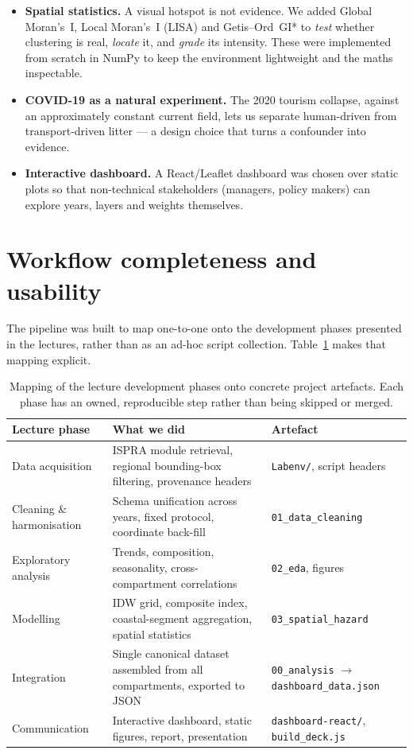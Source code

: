\documentclass[11pt,a4paper]{article}
\begin{document}
\begin{itemize}
\item \textbf{Spatial statistics.} A visual hotspot is not evidence. We added Global
Moran's~I, Local Moran's~I (LISA) and Getis--Ord~GI* to \emph{test} whether clustering is real,
\emph{locate} it, and \emph{grade} its intensity. These were implemented from scratch in NumPy to
keep the environment lightweight and the maths inspectable.

\item \textbf{COVID-19 as a natural experiment.} The 2020 tourism collapse, against an
approximately constant current field, lets us separate human-driven from transport-driven litter ---
a design choice that turns a confounder into evidence.

\item \textbf{Interactive dashboard.} A React/Leaflet dashboard was chosen over static plots so
that non-technical stakeholders (managers, policy makers) can explore years, layers and weights
themselves.
\end{itemize}

\section{Workflow completeness and usability}
The pipeline was built to map one-to-one onto the development phases presented in the lectures,
rather than as an ad-hoc script collection. Table~\ref{tab:phases} makes that mapping explicit.

\begin{table}[h]
\centering\small
\begin{tabular}{@{}p{3.2cm}p{5.0cm}p{5.0cm}@{}}
\toprule
\textbf{Lecture phase} & \textbf{What we did} & \textbf{Artefact}\\
\midrule
Data acquisition & ISPRA module retrieval, regional bounding-box filtering, provenance headers &
\texttt{Labenv/}, script headers\\
Cleaning \& harmonisation & Schema unification across years, fixed protocol, coordinate back-fill &
\texttt{01\_data\_cleaning}\\
Exploratory analysis & Trends, composition, seasonality, cross-compartment correlations &
\texttt{02\_eda}, figures\\
Modelling & IDW grid, composite index, coastal-segment aggregation, spatial statistics &
\texttt{03\_spatial\_hazard}\\
Integration & Single canonical dataset assembled from all compartments, exported to JSON &
\texttt{00\_analysis} $\rightarrow$ \texttt{dashboard\_data.json}\\
Communication & Interactive dashboard, static figures, report, presentation &
\texttt{dashboard-react/}, \texttt{build\_deck.js}\\
\bottomrule
\end{tabular}
\caption{Mapping of the lecture development phases onto concrete project artefacts. Each phase has
an owned, reproducible step rather than being skipped or merged.}
\label{tab:phases}
\end{table}
\end{document}
